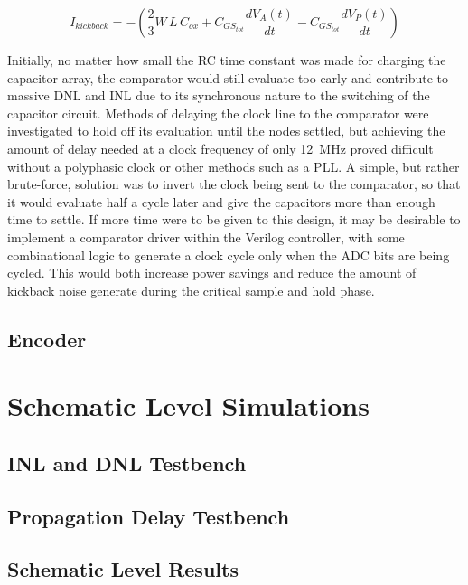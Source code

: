 \documentclass[11pt,letterpaper]{article}
\begin{document}
\begin{equation}
    I_{kickback} = -\left(\frac{2}{3}W\,L\,C_{ox} + C_{GS_{tot}}\frac{dV_A(t)}{dt} - C_{GS_{tot}}\frac{dV_P(t)}{dt}\right)\label{eq:kickback}
\end{equation}

Initially, no matter how small the RC time constant was made for charging the capacitor array, the comparator would still evaluate too early and contribute to massive DNL and INL due to its synchronous nature to the switching of the capacitor circuit. Methods of delaying the clock line to the comparator were investigated to hold off its evaluation until the nodes settled, but achieving the amount of delay needed at a clock frequency of only \qty{12}{\MHz} proved difficult without a polyphasic clock or other methods such as a PLL\@. A simple, but rather brute-force, solution was to invert the clock being sent to the comparator, so that it would evaluate half a cycle later and give the capacitors more than enough time to settle. If more time were to be given to this design, it may be desirable to implement a comparator driver within the Verilog controller, with some combinational logic to generate a clock cycle only when the ADC bits are being cycled. This would both increase power savings and reduce the amount of kickback noise generate during the critical sample and hold phase.

\subsection{Encoder}

\section{Schematic Level Simulations}

\subsection{INL and DNL Testbench}

\subsection{Propagation Delay Testbench}

\subsection{Schematic Level Results}
\end{document}
